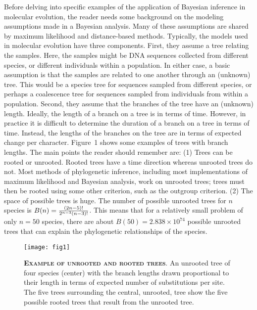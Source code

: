 \documentclass{svmult}
\begin{document}
Before delving into specific examples of the application of Bayesian inference in molecular evolution, the reader
needs some background on the modeling assumptions made in a Bayesian analysis. Many of these assumptions
are shared by maximum likelihood and distance-based methods.
Typically, the models used in molecular evolution have three components. First, they assume
a tree relating the samples. Here, the samples might be DNA sequences collected from different
species, or different individuals within a population. In either case, a basic assumption
is that the samples are related to one another through an (unknown) tree. This would be
a species tree for sequences sampled from different species, or perhaps a coalescence tree for sequences
sampled from individuals from within a population. Second, they assume that the branches
of the tree have an (unknown) length. Ideally, the length of a branch on a tree is in
terms of time. However, in practice it is difficult to determine the duration of a branch
on a tree in terms of time. Instead, the lengths of the branches on the tree are in terms
of expected change per character.  Figure~1 shows some examples of trees with branch lengths. The main points
the reader should remember are: (1) Trees can be rooted or unrooted. Rooted trees have a time direction whereas unrooted trees
do not. Most methods of phylogenetic inference, including most implementations of maximum likelihood and Bayesian
analysis, work on unrooted trees; trees must then be rooted using some other criterion, such as the outgroup criterion. 
(2) The space of possible trees
is huge. The number of possible unrooted trees for $n$ species is $B(n) = {(2n-5)! \over 2^{n-3}(n-3)!}$. This means that for a relatively small problem
of only $n=50$ species, there are about $B(50) = 2.838 \times 10^{74}$ possible unrooted trees that can explain the phylogenetic relationships of 
the species.
\begin{figure}[t]
\centering
\texttt{[image: fig1]}
\caption{\textbf{\textsc{Example of unrooted and rooted trees}}.
An unrooted tree of four species (center) with the branch lengths drawn proportional
to their length in terms of expected number of substitutions per site. The five trees 
surrounding the central, unrooted, tree show the five possible rooted trees that result
from the unrooted tree. 
}
\label{fig1}
\end{figure}
\end{document}
